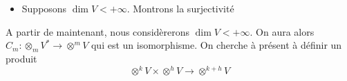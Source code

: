 \documentclass[../geometrie.tex]{subfiles}
\begin{document}
{{\begin{itemize}
$$					$$
					Ainsi pour tout $\beta \in F_{i}$, on a
					$$
						\sum_{\alpha \in F_{i}} E_{i}(v)(\alpha) \times \underset{= \delta_{\alpha, \beta}}{\underbrace{\alpha^{*}(\beta)}} = E_{i}(v)(\beta)
					$$
					D'où
					$$
						E_{i}(v) = \sum_{\alpha \in F_{i}} E_{i}(v)(\alpha) \times \alpha^{*}
					$$
					Soit enfin pour tout $v \in V$.
					$$
						\lambda(v) = E_{i}(v)(\lambda) = L(E_{i}(v)) = 0
					$$
					Or $\lambda \neq 0_{W_{i}}$, ce qui est absurde. \\
					Donc $E_{i}$ est surjective. \\
					Soit $(\beta_{1}, \cdots, \beta_{m}) \in F_{1} \times \cdots \times F_{m}$. \\
					Soient alors $v_{1}, \cdots, v_{m} \in V$ tels que
					$$
						\forall i \in [\![1, m]\!], E_{i}(v) = \beta_{i}^{*}
					$$
					Par linéarité de $C_{m}$, il vient
					$$
						\begin{aligned}
							C_{m} & (\xi)(v_{1 \to m}) \\
							& = \sum_{\alpha_{1} \in F_{1}} \cdots \sum_{\alpha_{m} \in F_{m}} a_{\alpha_{1 \to m}} C_{m}(\alpha_{1} \otimes \cdots \otimes \alpha_{m})(v_{1 \to m}) \\
							& = \sum_{\alpha_{1} \in F_{1}} \cdots \sum_{\alpha_{m} \in F_{m}} a_{\alpha_{1 \to m}} \prod_{i = 1}^{m} \alpha_{i}(v_{i})
						\end{aligned}
					$$
					Soit $i \in [\![1, m]\!]$, on a alors
					$$
						\alpha_{i}(v_{i}) = E_{i}(v_{i})(\alpha_{i}) = \beta_{i}^{*}(\alpha_{i}) = \delta_{\beta_{i}, \alpha_{i}}
					$$
					D'où
					$$
						\begin{aligned}
							C_{m} & (\xi)(v_{1 \to m}) \\
							& = \sum_{\alpha_{1} \in F_{1}} \cdots \sum_{\alpha_{m} \in F_{m}} a_{\alpha_{1 \to m}} \prod_{i = 1}^{m} \delta_{\beta_{i}, \alpha_{i}} \\
							& = a_{\beta_{1 \to m}}
						\end{aligned}
					$$
					Mais puisque $\xi \in \mathrm{Ker} \ C_{m}$, il vient que $a_{\beta_{1 \to m}} = 0$. \\
					Et l'injectivité de $C_{m}$.
				\item[$\bullet$] Supposons $\dim V < +\infty$. Montrons la surjectivité
			\end{itemize}
		}

		A partir de maintenant, nous considèrerons $\dim V < +\infty$. On aura alors $C_{m} : \otimes_{m} V^{*} \longrightarrow \otimes^{m} V$ qui est un isomorphisme. On cherche à présent à définir un produit
		$$
			\otimes^{k} V \times \otimes^{h} V \longrightarrow \otimes^{k + h} V
		$$
		
}
\end{document}
